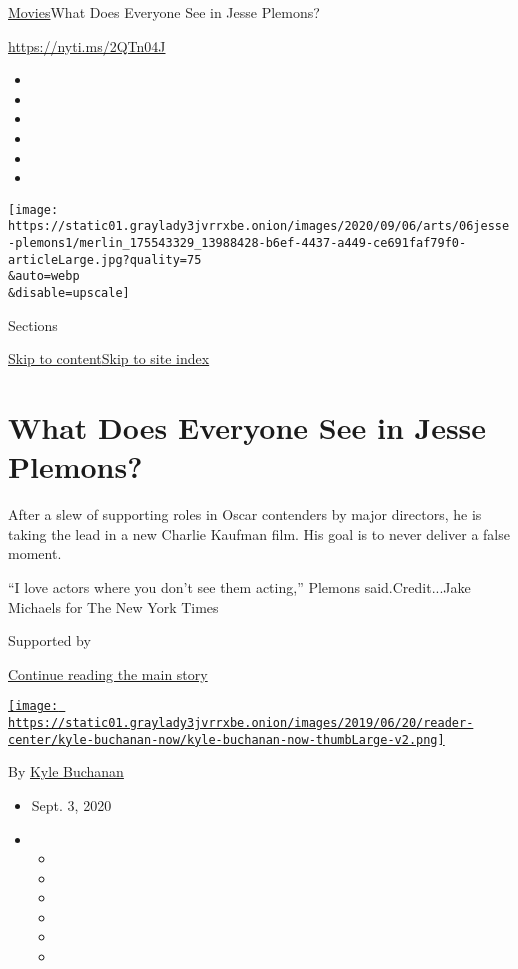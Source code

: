 \href{/section/movies}{Movies}\textbar{}What Does Everyone See in Jesse
Plemons?

\url{https://nyti.ms/2QTn04J}

\begin{itemize}
\item
\item
\item
\item
\item
\item
\end{itemize}

\texttt{[image: https://static01.graylady3jvrrxbe.onion/images/2020/09/06/arts/06jesse-plemons1/merlin\_175543329\_13988428-b6ef-4437-a449-ce691faf79f0-articleLarge.jpg?quality=75\\\&auto=webp\\\&disable=upscale]}

Sections

\protect\hyperlink{site-content}{Skip to
content}\protect\hyperlink{site-index}{Skip to site index}

\hypertarget{what-does-everyone-see-in-jesse-plemons}{%
\section{What Does Everyone See in Jesse
Plemons?}\label{what-does-everyone-see-in-jesse-plemons}}

After a slew of supporting roles in Oscar contenders by major directors,
he is taking the lead in a new Charlie Kaufman film. His goal is to
never deliver a false moment.

``I love actors where you don't see them acting,'' Plemons
said.Credit...Jake Michaels for The New York Times

Supported by

\protect\hyperlink{after-sponsor}{Continue reading the main story}

\href{https://www.nytimes3xbfgragh.onion/by/kyle-buchanan}{\texttt{[image: https://static01.graylady3jvrrxbe.onion/images/2019/06/20/reader-center/kyle-buchanan-now/kyle-buchanan-now-thumbLarge-v2.png]}}

By \href{https://www.nytimes3xbfgragh.onion/by/kyle-buchanan}{Kyle
Buchanan}

\begin{itemize}
\item
  Sept. 3, 2020
\item
  \begin{itemize}
  \item
  \item
  \item
  \item
  \item
  \item
  \end{itemize}
\end{itemize}

